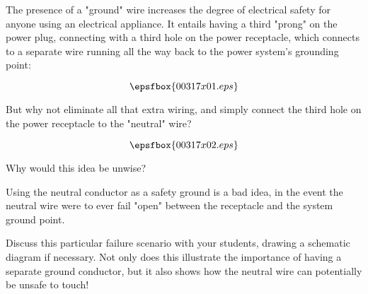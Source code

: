 

The presence of a "ground" wire increases the degree of electrical safety for anyone using an electrical appliance.  It entails having a third "prong" on the power plug, connecting with a third hole on the power receptacle, which connects to a separate wire running all the way back to the power system's grounding point:

$$\epsfbox{00317x01.eps}$$

But why not eliminate all that extra wiring, and simply connect the third hole on the power receptacle to the "neutral" wire?  

$$\epsfbox{00317x02.eps}$$

Why would this idea be unwise?







Using the neutral conductor as a safety ground is a bad idea, in the event the neutral wire were to ever fail "open" between the receptacle and the system ground point.







Discuss this particular failure scenario with your students, drawing a schematic diagram if necessary.  Not only does this illustrate the importance of having a separate ground conductor, but it also shows how the neutral wire can potentially be unsafe to touch!




